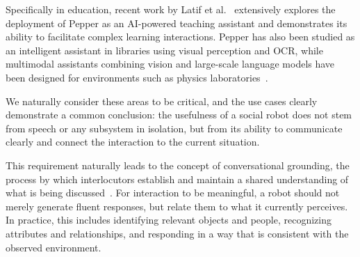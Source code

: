 Specifically in education, recent work by Latif et al.~\cite{sievers_humanoid_2025} extensively explores the deployment of Pepper as an AI-powered teaching assistant and demonstrates its ability to facilitate complex learning interactions. Pepper has also been studied as an intelligent assistant in libraries using visual perception and OCR, while multimodal assistants combining vision and large-scale language models have been designed for environments such as physics laboratories~\cite{trinquet_future_2025, latif_physicsassistant_2024}.



We naturally consider these areas to be critical, and the use cases clearly demonstrate a common conclusion: the usefulness of a social robot does not stem from speech or any subsystem in isolation, but from its ability to communicate clearly and connect the interaction to the current situation.

This requirement naturally leads to the concept of conversational grounding, the process by which interlocutors establish and maintain a shared understanding of what is being discussed~\cite{Clark_1996}. For interaction to be meaningful, a robot should not merely generate fluent responses, but relate them to what it currently perceives. In practice, this includes identifying relevant objects and people, recognizing attributes and relationships, and responding in a way that is consistent with the observed environment.


